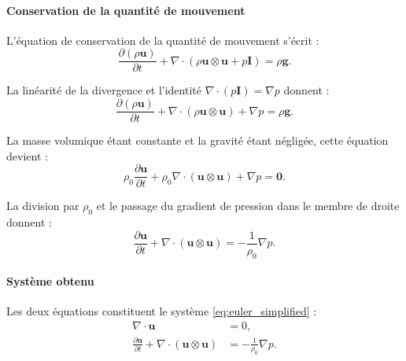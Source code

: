 \paragraph*{Conservation de la quantité de mouvement}

L'équation de conservation de la quantité de mouvement s'écrit :
\begin{equation}
    \frac{\partial (\rho \mathbf{u})}{\partial t}
    + \nabla \cdot \left(
        \rho \mathbf{u} \otimes \mathbf{u}
        + p \mathbf{I}
    \right)
    = \rho \mathbf{g}.
\end{equation}

La linéarité de la divergence et l'identité
$\nabla \cdot (p \mathbf{I}) = \nabla p$ donnent :
\begin{equation}
    \frac{\partial (\rho \mathbf{u})}{\partial t}
    + \nabla \cdot
        \left(\rho \mathbf{u} \otimes \mathbf{u}\right)
    + \nabla p
    = \rho \mathbf{g}.
\end{equation}

La masse volumique étant constante et la gravité étant négligée,
cette équation devient :
\begin{equation}
    \rho_0 \frac{\partial \mathbf{u}}{\partial t}
    + \rho_0 \nabla \cdot
        \left(\mathbf{u} \otimes \mathbf{u}\right)
    + \nabla p
    = \mathbf{0}.
\end{equation}

La division par $\rho_0$ et le passage du gradient de pression
dans le membre de droite donnent :
\begin{equation}
    \frac{\partial \mathbf{u}}{\partial t}
    + \nabla \cdot \left(\mathbf{u} \otimes \mathbf{u}\right)
    = -\frac{1}{\rho_0}\nabla p.
\end{equation}

\paragraph*{Système obtenu}

Les deux équations constituent
le système \eqref{eq:euler_simplified} :
\begin{equation*}
    \begin{aligned}
        \nabla \cdot \mathbf{u} &= 0, \\
        \frac{\partial \mathbf{u}}{\partial t}
        + \nabla \cdot \left(\mathbf{u} \otimes \mathbf{u}\right)
        &= -\frac{1}{\rho_0}\nabla p.
    \end{aligned}
\end{equation*}

